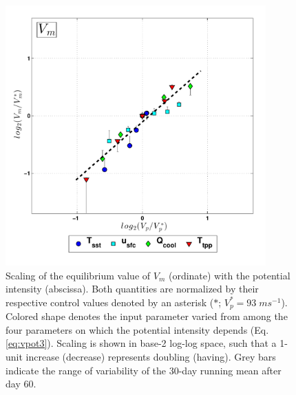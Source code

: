 \documentclass[12pt]{article}
\begin{document}
\begin{figure}[h!]
\centering
  \noindent\includegraphics[width=10cm,height=10cm]{FIGURES_TC_RCE_equilibrium_v2.0/Fig3_MPI_collapse_V.pdf}
\caption{Scaling of the equilibrium value of $V_m$ (ordinate) with the potential intensity (abscissa). Both quantities are normalized by their respective control values denoted by an asterisk ($*$; $V^*_p = 93 \; ms^{-1}$). Colored shape denotes the input parameter varied from among the four parameters on which the potential intensity depends (Eq. \eqref{eq:vpot3}). Scaling is shown in base-2 log-log space, such that a 1-unit increase (decrease) represents doubling (having). Grey bars indicate the range of variability of the 30-day running mean after day 60.}
\label{fig:mpicollapse_V}
\end{figure}
\end{document}
